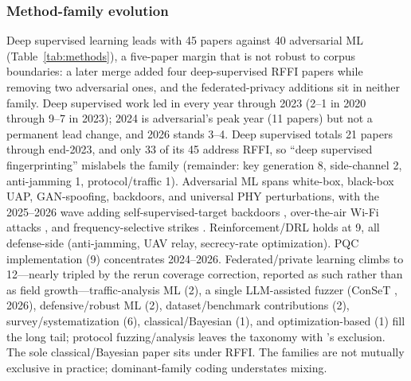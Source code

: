 \documentclass[10.5pt,compsoc,winfonts]{ICN}
\newcommand{\upcite}[1]{\cite{#1}}
\begin{document}
\subsubsection{Method-family evolution}
Deep supervised learning leads with 45 papers against 40 adversarial ML (Table~\ref{tab:methods}), a five-paper margin that is not robust to corpus boundaries: a later merge added four deep-supervised RFFI papers while removing two adversarial ones, and the federated-privacy additions sit in neither family. Deep supervised work led in every year through 2023 (2–1 in 2020 through 9–7 in 2023); 2024 is adversarial's peak year (11 papers) but not a permanent lead change, and 2026 stands 3–4. Deep supervised totals 21 papers through end-2023, and only 33 of its 45 address RFFI, so “deep supervised fingerprinting” mislabels the family (remainder: key generation 8, side-channel 2, anti-jamming 1, protocol/traffic 1). Adversarial ML spans white-box, black-box UAP, GAN-spoofing, backdoors, and universal PHY perturbations, with the 2025–2026 wave adding self-supervised-target backdoors \upcite{T41}, over-the-air Wi-Fi attacks \upcite{T42}, and frequency-selective strikes \upcite{T44}. Reinforcement/DRL holds at 9, all defense-side (anti-jamming, UAV relay, secrecy-rate optimization). PQC implementation (9) concentrates 2024–2026. Federated/private learning climbs to 12—nearly tripled by the rerun coverage correction, reported as such rather than as field growth—traffic-analysis ML (2), a single LLM-assisted fuzzer (ConSeT \upcite{T28}, 2026), defensive/robust ML (2), dataset/benchmark contributions (2), survey/systematization (6), classical/Bayesian (1), and optimization-based (1) fill the long tail; protocol fuzzing/analysis leaves the taxonomy with \upcite{T07}'s exclusion. The sole classical/Bayesian paper sits under RFFI. The families are not mutually exclusive in practice; dominant-family coding understates mixing.
\end{document}

